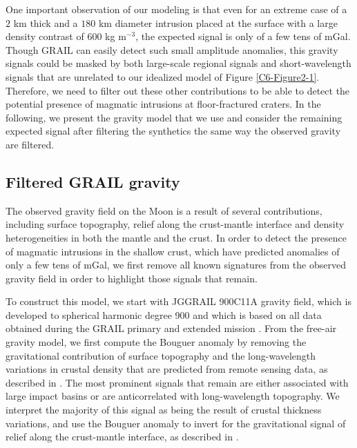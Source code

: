 One important observation of our modeling  is that even for an extreme
case of a $2$ km thick and a $180$ km diameter intrusion placed at the
surface  with a  large  density  contrast of  $600$  kg m$^{-3}$,  the
expected signal is only of a few tens of mGal. Though GRAIL can easily
detect such small  amplitude anomalies, this gravity  signals could be
masked  by  both  large-scale regional  signals  and  short-wavelength
signals  that  are   unrelated  to  our  idealized   model  of  Figure
\ref{C6-Figure2-1}.   Therefore,  we  need  to  filter  out  these  other
contributions to be able to  detect the potential presence of magmatic
intrusions at  floor-fractured craters.  In the  following, we present
the  gravity model  that we  use and  consider the  remaining expected
signal  after  filtering the  synthetics  the  same way  the  observed
gravity are filtered.

\subsection{Filtered GRAIL gravity}
\label{C6-sec:grails-gravity-model-1}

The  observed  gravity field  on  the  Moon  is  a result  of  several
contributions,   including  surface   topography,  relief   along  the
crust-mantle interface and density  heterogeneities in both the mantle
and the crust. In order to  detect the presence of magmatic intrusions
in the  shallow crust, which  have predicted  anomalies of only  a few
tens of mGal,  we first remove all known signatures  from the observed
gravity field in order to highlight those signals that remain.

To construct this model, we  start with JGGRAIL 900C11A gravity field,
which is developed to spherical harmonic degree 900 and which is based
on all  data obtained  during the GRAIL  primary and  extended mission
\citep{Konopliv:2014gm}.  From  the free-air  gravity model,  we first
compute the Bouguer anomaly by removing the gravitational contribution
of surface  topography and  the long-wavelength variations  in crustal
density that are  predicted from remote sensing data,  as described in
\citet{Wieczorek:2013ipa}. The most prominent  signals that remain are
either associated with large impact  basins or are anticorrelated with
long-wavelength topography.  We interpret  the majority of this signal
as  being the  result of  crustal  thickness variations,  and use  the
Bouguer anomaly to invert for the gravitational signal of relief along
the crust-mantle interface, as described in \citet{Wieczorek:2013ipa}.

